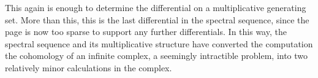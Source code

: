 \begin{subappendices}
\noindent
{}
This again is enough to determine the differential on a multiplicative generating set.
More than this, this is the last differential in the spectral sequence, since the page is now too sparse to support any further differentials.
In this way, the spectral sequence and its multiplicative structure have converted the computation the cohomology of an infinite complex, a seemingly intractible problem, into two relatively minor calculations in the complex.

\begin{remark}
\end{remark}



\end{subappendices}
